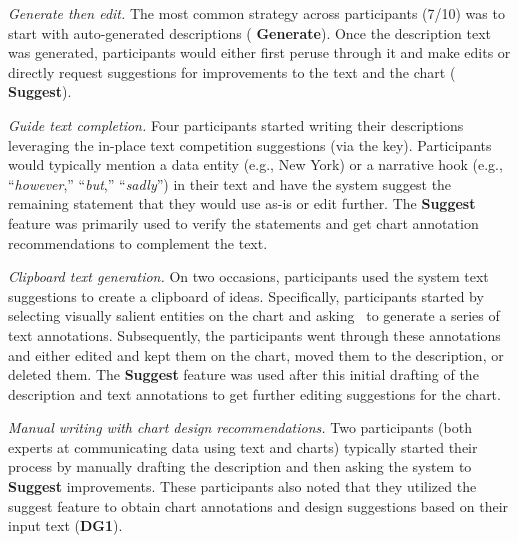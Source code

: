 \begin{tightItemize}
    \item \textit{Generate then edit.}
    The most common strategy across participants (7/10) was to start with auto-generated descriptions ({\small{}} \textbf{Generate}).
    Once the description text was generated, participants would either first peruse through it and make edits or directly request suggestions for improvements to the text and the chart ({\small{}} \textbf{Suggest}).
    
    \vspace{.5em}
    \item \textit{Guide text completion.}
    Four participants started writing their descriptions leveraging the in-place text competition suggestions (via the  key).
    Participants would typically mention a data entity (e.g., New York) or a narrative hook (e.g., ``\textit{however},'' ``\textit{but},'' ``\textit{sadly}'') in their text and have the system suggest the remaining statement that they would use as-is or edit further.
    The {\small{}} \textbf{Suggest} feature was primarily used to verify the statements and get chart annotation recommendations to complement the text.

    \vspace{.5em}
    \item \textit{Clipboard text generation.}
    On two occasions, participants used the system text suggestions to create a clipboard of ideas.
    Specifically, participants started by selecting visually salient entities on the chart and asking \pluto~to generate a series of text annotations. Subsequently, the participants went through these annotations and either edited and kept them on the chart, moved them to the description, or deleted them.
    The {\small{}} \textbf{Suggest} feature was used after this initial drafting of the description and text annotations to get further editing suggestions for the chart.

    \vspace{.5em}
    \item \textit{Manual writing with chart design recommendations.}
    Two participants (both experts at communicating data using text and charts) typically started their process by manually drafting the description and then asking the system to {\small{}} \textbf{Suggest} improvements. These participants also noted that they utilized the suggest feature to obtain chart annotations and design suggestions based on their input text (\textbf{DG1}).
\end{tightItemize}